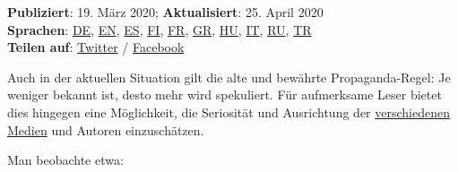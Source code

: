 \textbf{Publiziert}: 19. März 2020; \textbf{Aktualisiert}: 25. April
2020\\
\textbf{Sprachen}:
\href{https://swprs.org/corona-medien-propaganda/}{DE},
\href{https://swprs.org/corona-media-propaganda/}{EN},
\href{http://piensachile.com/2020/03/corona-medios-de-comunicacion-propaganda/}{ES},
\href{https://swprs.org/koronasta-mediasta-ja-propagandasta/}{FI},
\href{https://swprs.org/sur-le-coronavirus-les-medias-et-la-propagande/}{FR},
\href{https://swprs.org/corona-media-propaganda-greek/}{GR},
\href{https://swprs.org/korona-media-propaganda/}{HU},
\href{https://swprs.org/corona-media-propaganda-it/}{IT},
\href{https://swprs.org/\%d0\%be-\%d0\%ba\%d0\%be\%d1\%80\%d0\%be\%d0\%bd\%d0\%b0\%d0\%b2\%d0\%b8\%d1\%80\%d1\%83\%d1\%81\%d0\%b5-\%d1\%81\%d0\%bc\%d0\%b8-\%d0\%b8-\%d0\%bf\%d1\%80\%d0\%be\%d0\%bf\%d0\%b0\%d0\%b3\%d0\%b0\%d0\%bd\%d0\%b4\%d0\%b5/}{RU},
\href{https://swprs.org/korona-medya-ve-propaganda-uezerine/}{TR}\\
\textbf{Teilen auf}:
\href{https://twitter.com/intent/tweet?url=https://swprs.org/corona-medien-propaganda/}{Twitter}
/
\href{https://www.facebook.com/share.php?u=https://swprs.org/corona-medien-propaganda/}{Facebook}

Auch in der aktuellen Situation gilt die alte und bewährte
Propaganda-Regel: Je weniger bekannt ist, desto mehr wird spekuliert.
Für aufmerksame Leser bietet dies hingegen eine Möglichkeit, die
Seriosität und Ausrichtung der
\href{https://swprs.org/medien-navigator/}{verschiedenen Medien} und
Autoren einzuschätzen.

Man beobachte etwa:

